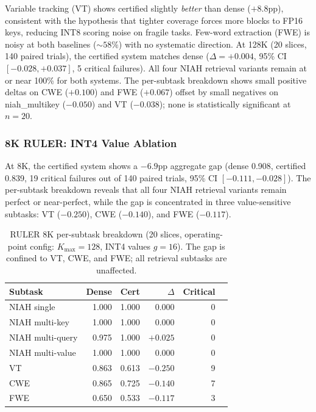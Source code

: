\documentclass[11pt,a4paper]{article}
\theoremstyle{definition}
\theoremstyle{remark}
\begin{document}
Variable tracking (VT) shows certified slightly \emph{better} than dense ($+8.8$pp), consistent with the hypothesis that tighter coverage forces more blocks to FP16 keys, reducing INT8 scoring noise on fragile tasks.  Few-word extraction (FWE) is noisy at both baselines (${\sim}58\%$) with no systematic direction.  At 128K (20 slices, 140 paired trials), the certified system matches dense ($\Delta{=}{+}0.004$, 95\% CI $[-0.028, {+}0.037]$, 5 critical failures).  All four NIAH retrieval variants remain at or near 100\% for both systems.  The per-subtask breakdown shows small positive deltas on CWE ($+0.100$) and FWE ($+0.067$) offset by small negatives on niah\_multikey ($-0.050$) and VT ($-0.038$); none is statistically significant at $n{=}20$.

\subsubsection{8K RULER: INT4 Value Ablation}
\label{sec:ruler_8k_ablation}

At 8K, the certified system shows a $-6.9$pp aggregate gap (dense 0.908, certified 0.839, 19 critical failures out of 140 paired trials, 95\% CI $[-0.111, -0.028]$).  The per-subtask breakdown reveals that all four NIAH retrieval variants remain perfect or near-perfect, while the gap is concentrated in three value-sensitive subtasks: VT ($-0.250$), CWE ($-0.140$), and FWE ($-0.117$).

\begin{table}[H]
\centering
\caption{RULER 8K per-subtask breakdown (20 slices, operating-point config: $K_{\max}{=}128$, INT4 values $g{=}16$).  The gap is confined to VT, CWE, and FWE; all retrieval subtasks are unaffected.}
\label{tab:ruler_8k_subtask}
\small
\begin{tabular}{lrrrrr}
\toprule
\textbf{Subtask} & \textbf{Dense} & \textbf{Cert} & \textbf{$\Delta$} & \textbf{Critical} \\
\midrule
NIAH single      & 1.000 & 1.000 & $0.000$  & 0 \\
NIAH multi-key   & 1.000 & 1.000 & $0.000$  & 0 \\
NIAH multi-query & 0.975 & 1.000 & $+0.025$ & 0 \\
NIAH multi-value & 1.000 & 1.000 & $0.000$  & 0 \\
VT               & 0.863 & 0.613 & $-0.250$ & 9 \\
CWE              & 0.865 & 0.725 & $-0.140$ & 7 \\
FWE              & 0.650 & 0.533 & $-0.117$ & 3 \\
\bottomrule
\end{tabular}
\end{table}
\end{document}
